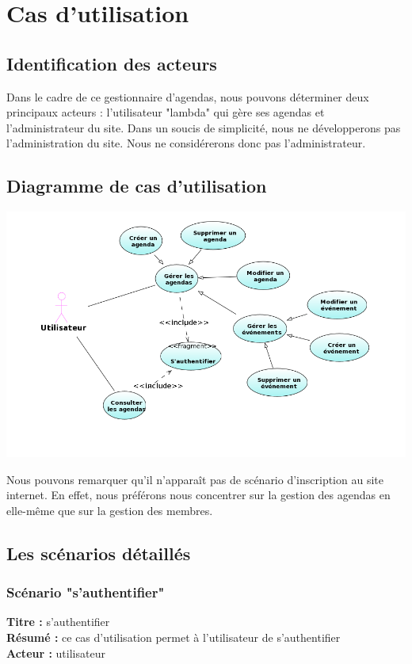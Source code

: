 \documentclass[12pt , a4paper]{article}
\begin{document}
\newpage
\section{Cas d'utilisation}
\subsection{Identification des acteurs}
Dans le cadre de  ce gestionnaire d'agendas, nous pouvons déterminer deux  principaux acteurs : l'utilisateur "lambda" qui gère  ses agendas et l'administrateur du site. Dans  un soucis de simplicité,
nous ne développerons pas l'administration du site. Nous ne considérerons donc pas l'administrateur.
\subsection{Diagramme de cas d'utilisation}
	\begin{center}
	  \includegraphics[scale=0.6]{./images/use_cases.png}
	\end{center}
\noindent Nous pouvons remarquer qu'il  n'apparaît pas de scénario d'inscription au site internet. En effet,  nous préférons nous concentrer sur la gestion des agendas  en elle-même que sur la gestion
des membres.

\subsection{Les scénarios détaillés}
\subsubsection{Scénario "s'authentifier"}

\noindent\textbf{Titre : } s'authentifier\\
\textbf{Résumé : } ce cas d'utilisation permet à l'utilisateur de s'authentifier\\
\textbf{Acteur : }utilisateur\\
\end{document}
